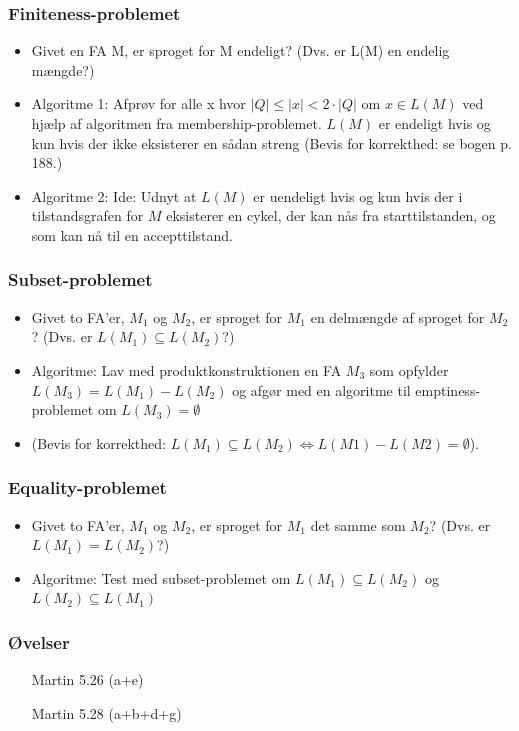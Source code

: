 \begin{frame}
  \frametitle{Finiteness-problemet}
  \begin{itemize}[<+->]
  \item Givet en FA M, er sproget for M endeligt?  
    (Dvs. er L(M) en endelig mængde?) 
  \item
    Algoritme 1: 
    Afprøv for alle x hvor $|Q| \leq |x| < 2\cdot |Q|$ om $x\in L(M)$ ved  
    hjælp af algoritmen fra membership-problemet.
    $L(M)$ er endeligt hvis og kun hvis der ikke eksisterer en  
    sådan streng 
    (Bevis for korrekthed: se bogen p. 188.)
  \item 
    Algoritme 2: Ide: Udnyt at $L(M)$ er uendeligt hvis og kun hvis der i
    tilstandsgrafen for $M$ eksisterer en cykel, der kan nås fra
    starttilstanden, og som kan nå til en accepttilstand.
  \end{itemize}
\end{frame}

\begin{frame}
\frametitle{Subset-problemet}
\begin{itemize}[<+->]
\item Givet to FA’er, $M_1$ og $M_2$, er sproget for $M_1$ en delmængde  
af sproget for $M_2$? (Dvs. er $L(M_1)\subseteq L(M_2)$?) 
\item Algoritme: 
Lav med produktkonstruktionen en FA $M_3$ som opfylder  
$L(M_3) = L(M_1) - L(M_2)$ og afgør med en algoritme til  
emptiness-problemet om $L(M_3)=\emptyset$ 
\item (Bevis for korrekthed:  $L(M_1)\subseteq L(M_2)  \Leftrightarrow  L(M1) - L(M2) = \emptyset$).
\end{itemize}
\end{frame}

\begin{frame}
\frametitle{Equality-problemet}
\begin{itemize}[<+->]
\item Givet to FA’er, $M_1$ og $M_2$, er sproget for $M_1$ det samme som $M_2$? (Dvs. er $L(M_1)=L(M_2)$?) 
\item Algoritme:
  Test med subset-problemet om $L(M_1) \subseteq L(M_2)$ og $L(M_2) \subseteq L(M_1)$
\end{itemize}
\end{frame}

\begin{frame}
\frametitle{Øvelser}
\begin{itemize}[<+->]
\item  [Martin] 5.26 (a+e) 
\item  [Martin] 5.28 (a+b+d+g)
\end{itemize}
\end{frame}


